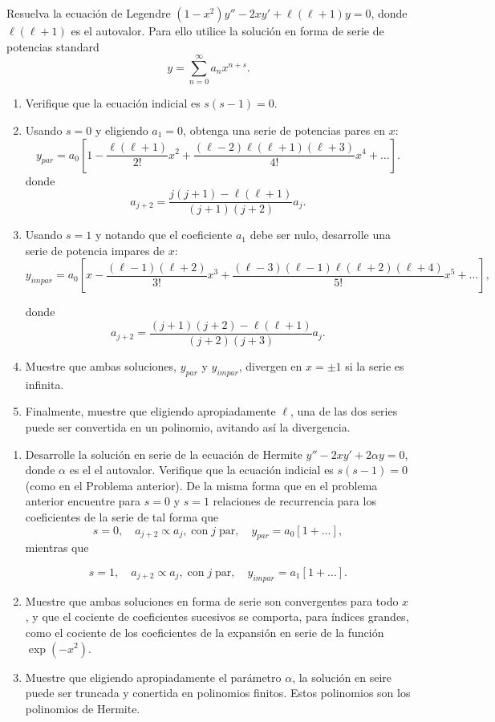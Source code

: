 \documentclass[11pt,spanish]{article}
\newcounter{problema}
\begin{document}
\prob{}
Resuelva la ecuación de Legendre $ (1-x^2) y'' - 2 x y' + \ell(\ell+1) y = 0$,
donde $\ell(\ell+1)$ es el autovalor. Para ello utilice la solución en forma de
serie de potencias standard
\[
 y = \sum_{n=0}^{\infty} a_n x^{n+s} .
\]
\begin{enumerate}
\item Verifique que la ecuación indicial es $ s(s-1) = 0$.

\item Usando $s=0$ y eligiendo $a_1=0$, obtenga una serie de potencias pares en 
$x$:
\[
 y_{par} = a_0 \left[ 1 - \frac{\ell(\ell+1)}{2!} x^2 + \frac{(\ell-2) \ell (\ell+1)(\ell+3)}{4 
!} x^4 + \ldots \right] .
\]
donde
\[
 a_{j+2} = \frac{j(j+1) - \ell(\ell+1)}{(j+1)(j+2)} a_j .
\]

\item Usando $s=1$ y notando que el coeficiente $a_1$ debe ser nulo, desarrolle 
una serie de potencia impares de $x$:
\[
 y_{impar}= a_0 \left[ x - \frac{(\ell-1)(\ell+2)}{3!} x^3
+ \frac{(\ell-3)(\ell-1) \ell (\ell+2)(\ell+4)}{5!} x^5 + \ldots \right],
\]

donde
\[
a_{j+2} = \frac{(j+1)(j+2) - \ell(\ell+1)}{(j+2)(j+3)} a_j . 
\]

\item Muestre que ambas soluciones, $y_{par}$ y $y_{impar}$, divergen en $x=\pm 1$ 
si la serie es infinita.

\item Finalmente, muestre que eligiendo apropiadamente $\ell$, una de las dos series 
puede ser convertida en un polinomio, avitando así la divergencia.\\

\end{enumerate}


\prob{}
\begin{enumerate}
\item Desarrolle la solución en serie de la ecuación de Hermite $y'' - 2x y' + 2 \alpha y = 0$, donde $\alpha$ es el el autovalor. Verifique que la 
ecuación indicial es $s(s-1) = 0$ (como en el Problema anterior). De la misma 
forma que en el problema anterior encuentre para $s=0$ y $s=1$ relaciones de 
recurrencia para los coeficientes de la serie de tal forma que
\[
 s= 0 , \quad a_{j+2} \propto a_j, \; \mbox{con} \; j  \; \mbox{par}, \quad 
y_{par} = a_0 \left[ 1 + \ldots\right] ,
\]
mientras que

\[
 s= 1 , \quad a_{j+2} \propto a_j, \; \mbox{con} \; j  \; \mbox{par}, \quad 
y_{impar} = a_1 \left[ 1 + \ldots\right] .
\]

\item Muestre que ambas soluciones en forma de serie son convergentes para todo 
$x$, y que el cociente de coeficientes sucesivos se comporta, para índices 
grandes, como el cociente de los coeficientes de la expansión en serie de la 
función $\exp(-x^2)$.

\item Muestre que eligiendo apropiadamente el parámetro $\alpha$, la solución en 
seire puede ser truncada y conertida en polinomios finitos. Estos polinomios 
son los polinomios de Hermite.\\
\end{enumerate}
\end{document}

